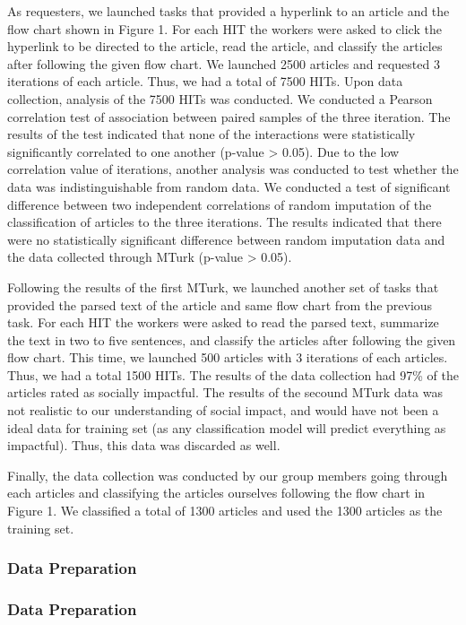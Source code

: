 \documentclass[10pt,letterpaper]{article}
\begin{document}
As requesters, we launched tasks that provided a hyperlink to an article
and the flow chart shown in Figure 1. For each HIT the workers were
asked to click the hyperlink to be directed to the article, read the
article, and classify the articles after following the given flow chart.
We launched 2500 articles and requested 3 iterations of each article.
Thus, we had a total of 7500 HITs. Upon data collection, analysis of the
7500 HITs was conducted. We conducted a Pearson correlation test of
association between paired samples of the three iteration. The results
of the test indicated that none of the interactions were statistically
significantly correlated to one another (p-value \textgreater{} 0.05).
Due to the low correlation value of iterations, another analysis was
conducted to test whether the data was indistinguishable from random
data. We conducted a test of significant difference between two
independent correlations of random imputation of the classification of
articles to the three iterations. The results indicated that there were
no statistically significant difference between random imputation data
and the data collected through MTurk (p-value \textgreater{} 0.05).

Following the results of the first MTurk, we launched another set of
tasks that provided the parsed text of the article and same flow chart
from the previous task. For each HIT the workers were asked to read the
parsed text, summarize the text in two to five sentences, and classify
the articles after following the given flow chart. This time, we
launched 500 articles with 3 iterations of each articles. Thus, we had a
total 1500 HITs. The results of the data collection had 97\% of the
articles rated as socially impactful. The results of the secound MTurk
data was not realistic to our understanding of social impact, and would
have not been a ideal data for training set (as any classification model
will predict everything as impactful). Thus, this data was discarded as
well.

Finally, the data collection was conducted by our group members going
through each articles and classifying the articles ourselves following
the flow chart in Figure 1. We classified a total of 1300 articles and
used the 1300 articles as the training set.

\subsubsection{Data Preparation}\label{data-preparation}
\hypertarget{data-preparation}{%
\subsubsection{Data Preparation}\label{data-preparation}}
\end{document}
